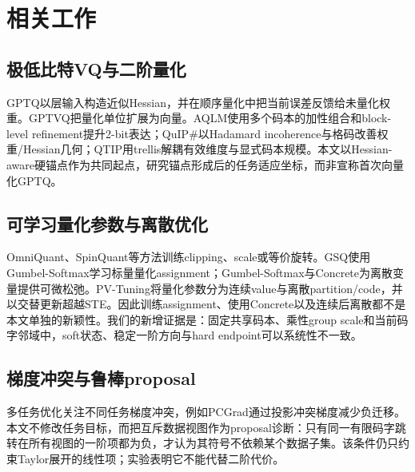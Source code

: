 \section{相关工作}

\subsection{极低比特VQ与二阶量化}

GPTQ以层输入构造近似Hessian，并在顺序量化中把当前误差反馈给未量化权重\cite{gptq}。GPTVQ把量化单位扩展为向量\cite{gptvq}。AQLM使用多个码本的加性组合和block-level refinement提升2-bit表达\cite{aqlm}；QuIP\#以Hadamard incoherence与格码改善权重/Hessian几何\cite{quipsharp}；QTIP用trellis解耦有效维度与显式码本规模\cite{qtip}。本文以Hessian-aware硬锚点作为共同起点，研究锚点形成后的任务适应坐标，而非宣称首次向量化GPTQ。

\subsection{可学习量化参数与离散优化}

OmniQuant、SpinQuant等方法训练clipping、scale或等价旋转\cite{omniquant,spinquant}。GSQ使用Gumbel-Softmax学习标量量化assignment\cite{gsq}；Gumbel-Softmax与Concrete为离散变量提供可微松弛\cite{gumbel,concrete}。PV-Tuning将量化参数分为连续value与离散partition/code，并以交替更新超越STE\cite{pvtuning}。因此训练assignment、使用Concrete以及连续后离散都不是本文单独的新颖性。我们的新增证据是：固定共享码本、乘性group scale和当前码字邻域中，soft状态、稳定一阶方向与hard endpoint可以系统性不一致。

\subsection{梯度冲突与鲁棒proposal}

多任务优化关注不同任务梯度冲突，例如PCGrad通过投影冲突梯度减少负迁移\cite{pcgrad}。本文不修改任务目标，而把互斥数据视图作为proposal诊断：只有同一有限码字跳转在所有视图的一阶项都为负，才认为其符号不依赖某个数据子集。该条件仍只约束Taylor展开的线性项；实验表明它不能代替二阶代价。
